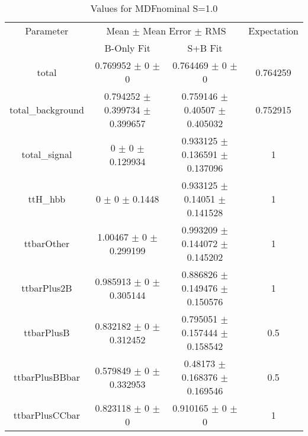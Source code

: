\begin{table}
\centering
\caption{Values for MDFnominal S=1.0}
\begin{tabular}{cccc}
\toprule
Parameter & \multicolumn{2}{c}{Mean $\pm$ Mean Error $\pm$ RMS} & Expectation\\
 & B-Only Fit & S+B Fit & \\
\midrule
total & \num{0.769952} $\pm$ \num{0} $\pm$ \num{0} & \num{0.764469} $\pm$ \num{0} $\pm$ \num{0} & \num{0.764259}\\
total\_background & \num{0.794252} $\pm$ \num{0.399734} $\pm$ \num{0.399657} & \num{0.759146} $\pm$ \num{0.40507} $\pm$ \num{0.405032} & \num{0.752915}\\
total\_signal & \num{0} $\pm$ \num{0} $\pm$ \num{0.129934} & \num{0.933125} $\pm$ \num{0.136591} $\pm$ \num{0.137096} & \num{1}\\
ttH\_hbb & \num{0} $\pm$ \num{0} $\pm$ \num{0.1448} & \num{0.933125} $\pm$ \num{0.14051} $\pm$ \num{0.141528} & \num{1}\\
ttbarOther & \num{1.00467} $\pm$ \num{0} $\pm$ \num{0.299199} & \num{0.993209} $\pm$ \num{0.144072} $\pm$ \num{0.145202} & \num{1}\\
ttbarPlus2B & \num{0.985913} $\pm$ \num{0} $\pm$ \num{0.305144} & \num{0.886826} $\pm$ \num{0.149476} $\pm$ \num{0.150576} & \num{1}\\
ttbarPlusB & \num{0.832182} $\pm$ \num{0} $\pm$ \num{0.312452} & \num{0.795051} $\pm$ \num{0.157444} $\pm$ \num{0.158542} & \num{0.5}\\
ttbarPlusBBbar & \num{0.579849} $\pm$ \num{0} $\pm$ \num{0.332953} & \num{0.48173} $\pm$ \num{0.168376} $\pm$ \num{0.169546} & \num{0.5}\\
ttbarPlusCCbar & \num{0.823118} $\pm$ \num{0} $\pm$ \num{0} & \num{0.910165} $\pm$ \num{0} $\pm$ \num{0} & \num{1}\\
\bottomrule
\end{tabular}
\end{table}